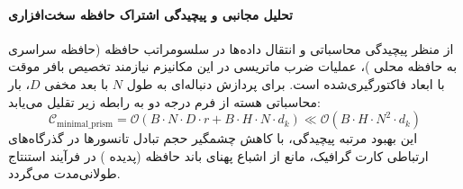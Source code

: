 \paragraph{تحلیل مجانبی و پیچیدگی اشتراک حافظه سخت‌افزاری}
از منظر پیچیدگی محاسباتی و انتقال داده‌ها در سلسومراتب حافظه (حافظه سراسری  به حافظه محلی )، عملیات ضرب ماتریسی در این مکانیزم نیازمند تخصیص بافر موقت با ابعاد فاکتورگیری‌شده است. برای پردازش دنباله‌ای به طول $N$ با بعد مخفی $D$، بار محاسباتی هسته از فرم درجه دو به رابطه زیر تقلیل می‌یابد:
\begin{equation}
\label{eq:complexity_minimal_prism}
\mathcal{C}_{\text{minimal\_prism}} = \mathcal{O}\left( B \cdot N \cdot D \cdot r + B \cdot H \cdot N \cdot d_k \right) \ll \mathcal{O}\left( B \cdot H \cdot N^2 \cdot d_k \right)
\end{equation}
این بهبود مرتبه پیچیدگی، با کاهش چشمگیر حجم تبادل تانسورها در گذرگاه‌های ارتباطی کارت گرافیک، مانع از اشباع پهنای باند حافظه (پدیده ) در فرآیند استنتاج طولانی‌مدت می‌گردد.
